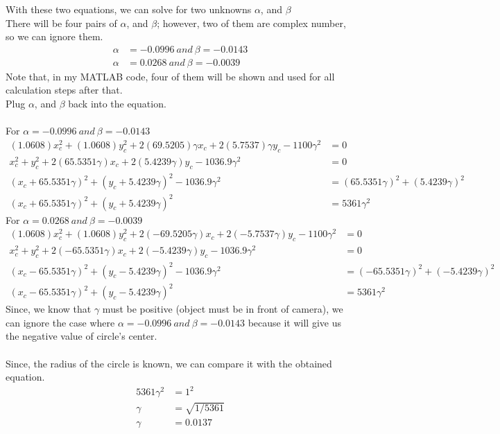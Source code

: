 \documentclass[]{article}
\begin{document}
\indent With these two equations, we can solve for two unknowns $\alpha$, and $\beta$\\
\indent There will be four pairs of $\alpha$, and $\beta$; however, two of them are complex number, so we can ignore them.
\begin{align*}
\alpha &= -0.0996 \ and \ \beta = -0.0143\\
\alpha &= 0.0268 \ and \ \beta = -0.0039
\end{align*}
\indent Note that, in my MATLAB code, four of them will be shown and used for all calculation steps after that.\\
\indent Plug $\alpha$, and $\beta$ back into the equation.\\
\\
For $\alpha = -0.0996 \ and \ \beta = -0.0143$
\begin{align*}
(1.0608)x_c^2+(1.0608)y_c^2+2(69.5205)\gamma x_c+2(5.7537)\gamma y_c-1100\gamma^2 &= 0\\
x_c^2+y_c^2+2(65.5351\gamma) x_c+2(5.4239\gamma) y_c-1036.9\gamma^2 &= 0\\
(x_c+65.5351\gamma)^2+(y_c+5.4239\gamma)^2-1036.9\gamma^2 &= (65.5351\gamma)^2 + (5.4239\gamma)^2\\
(x_c+65.5351\gamma)^2+(y_c+5.4239\gamma)^2 &= 5361\gamma^2
\end{align*}
For $\alpha = 0.0268 \ and \ \beta = -0.0039$
\begin{align*}
(1.0608)x_c^2+(1.0608)y_c^2+2(-69.5205\gamma) x_c+2(-5.7537\gamma) y_c-1100\gamma^2 &= 0\\
x_c^2+y_c^2+2(-65.5351\gamma) x_c+2(-5.4239\gamma) y_c-1036.9\gamma^2 &= 0\\
(x_c-65.5351\gamma)^2+(y_c-5.4239\gamma)^2-1036.9\gamma^2 &= (-65.5351\gamma)^2 + (-5.4239\gamma)^2\\
(x_c-65.5351\gamma)^2+(y_c-5.4239\gamma)^2 &= 5361\gamma^2
\end{align*}
\indent Since, we know that $\gamma$ must be positive (object must be in front of camera), we can ignore the case where $\alpha = -0.0996 \ and \ \beta = -0.0143$ because it will give us the negative value of circle's center.\\
\\
\indent Since, the radius of the circle is known, we can compare it with the obtained equation.
\begin{align*}
5361\gamma^2 &= 1^2\\
\gamma &= \sqrt{1/5361}\\
\gamma &= 0.0137
\end{align*}
\end{document}
